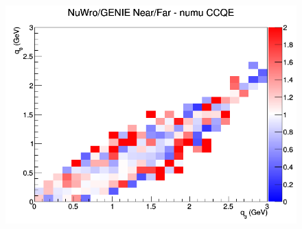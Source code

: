 \begin{figure}[h]
\endminipage
{}
\includegraphics[width=\linewidth]{eff_q0_q3/FGT/ratios/CCQE_NuWro_GENIE_numu_NF_q3_q0.png}
\endminipage
\newline
\end{figure}
\clearpage
